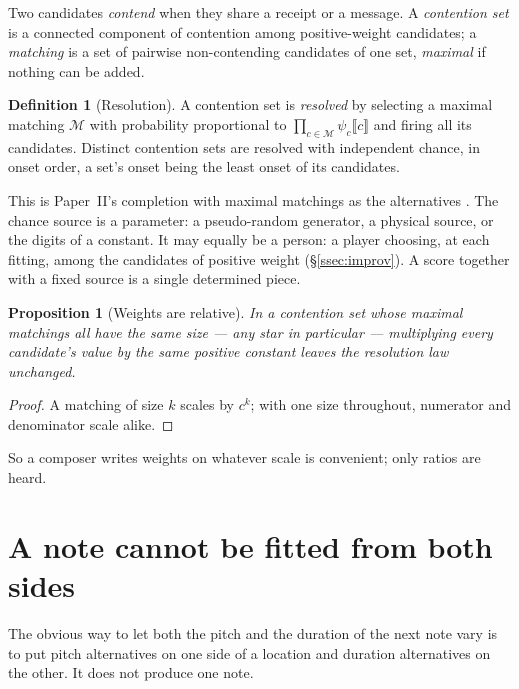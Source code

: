 \documentclass[11pt,a4paper]{article}
\theoremstyle{plain}
\newtheorem{proposition}[theorem]{Proposition}
\theoremstyle{definition}
\newtheorem{definition}[theorem]{Definition}
\theoremstyle{remark}
\begin{document}
Two candidates \emph{contend} when they share a receipt or a message. A
\emph{contention set} is a connected component of contention among
positive-weight candidates; a \emph{matching} is a set of pairwise
non-contending candidates of one set, \emph{maximal} if nothing can be added.

\begin{definition}[Resolution]\label{def:resolve}
A contention set is \emph{resolved} by selecting a maximal matching
$\mathcal{M}$ with probability proportional to
$\prod_{c\in\mathcal{M}}\psi_c\llbracket c\rrbracket$ and firing all its
candidates. Distinct contention sets are resolved with independent chance, in
onset order, a set's onset being the least onset of its candidates.
\end{definition}

This is Paper~II's completion with maximal matchings as the alternatives
\cite{GWpln,GWquantum}. The chance source is a parameter: a pseudo-random
generator, a physical source, or the digits of a constant. It may equally be a
person: a player choosing, at each fitting, among the candidates of positive
weight (\S\ref{ssec:improv}). A score together with a fixed source is a single
determined piece.

\begin{proposition}[Weights are relative]\label{prop:relative}
In a contention set whose maximal matchings all have the same size --- any star
in particular --- multiplying every candidate's value by the same positive
constant leaves the resolution law unchanged.
\end{proposition}
\begin{proof}
A matching of size $k$ scales by $c^k$; with one size throughout, numerator and
denominator scale alike.
\end{proof}

So a composer writes weights on whatever scale is convenient; only ratios are
heard.

\section{A note cannot be fitted from both sides}\label{sec:twosided}

The obvious way to let both the pitch and the duration of the next note vary is
to put pitch alternatives on one side of a location and duration alternatives
on the other. It does not produce one note.
\end{document}
